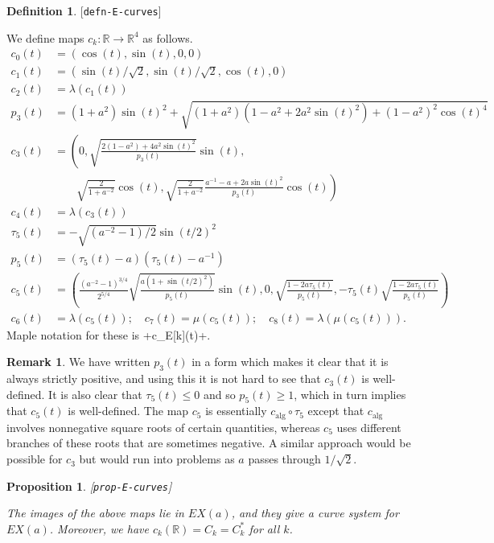 \documentclass[reqno]{amsart}
\newcommand{\lbl}[1]{\label{#1}\textup{[\texttt{#1}]}\par}
\newcommand{\lbl}{\label}
\newcommand{\alg}	{\operatorname{alg}}
\newcommand{\lm}        {\lambda}
\newcommand{\R}         {{\mathbb{R}}}
\newcommand{\rt}        {\sqrt{2}}
\renewcommand{\:}{\colon}
\newtheorem{proposition}[theorem]{Proposition}
\theoremstyle{definition}
\newtheorem{remark}[theorem]{Remark}
\newtheorem{definition}[theorem]{Definition}
\begin{document}
\begin{definition}\lbl{defn-E-curves}
 We define maps $c_k\:\R\to\R^4$ as follows.
 \begin{align*}
  c_0(t) &= (\cos(t),\sin(t),0,0) \\
  c_1(t) &= (\sin(t)/\rt,\sin(t)/\rt,\cos(t),0) \\
  c_2(t) &= \lm(c_1(t)) \\
  p_3(t) &= (1+a^2)\sin(t)^2 +
            \sqrt{(1+a^2)(1-a^2+2a^2\sin(t)^2)+(1-a^2)^2\cos(t)^4} \\
  c_3(t) &= \left(0,
             \sqrt{\frac{2(1-a^2)+4a^2\sin(t)^2}{p_3(t)}}\sin(t),\right.\\
         &\qquad \left.\sqrt{\frac{2}{1+a^{-2}}}\cos(t),
             \sqrt{\frac{2}{1+a^{-2}}}\frac{a^{-1}-a+2a\sin(t)^2}{p_3(t)}\cos(t)\right)\\
  c_4(t) &= \lm(c_3(t)) \\
  \tau_5(t) &= -\sqrt{(a^{-2}-1)/2}\sin(t/2)^2 \\
  p_5(t) &= (\tau_5(t)-a)(\tau_5(t)-a^{-1}) \\
  c_5(t) &= \left(
         \frac{(a^{-2}-1)^{3/4}}{2^{5/4}}\sqrt{\frac{a(1+\sin(t/2)^2)}{p_5(t)}}\sin(t),
         0, \sqrt{\frac{1-2a\tau_5(t)}{p_5(t)}},
         -\tau_5(t)\sqrt{\frac{1-2a\tau_5(t)}{p_5(t)}}
           \right) \\
  c_6(t) &= \lm(c_5(t)); \quad
  c_7(t)  = \mu(c_5(t)); \quad
  c_8(t)  = \lm(\mu(c_5(t))).
 \end{align*}
 Maple notation for these is \mcode+c_E[k](t)+.
\end{definition}
\begin{remark}
 We have written $p_3(t)$ in a form which makes it clear that it is
 always strictly positive, and using this it is not hard to see
 that $c_3(t)$ is well-defined.  It is also clear that
 $\tau_5(t)\leq 0$ and so $p_5(t)\geq 1$, which in turn implies that
 $c_5(t)$ is well-defined.  The map $c_5$ is essentially
 $c_{\alg}\circ\tau_5$ except that $c_{\alg}$ involves nonnegative
 square roots of certain quantities, whereas $c_5$ uses different
 branches of these roots that are sometimes negative.  A similar
 approach would be possible for $c_3$ but would run into problems as
 $a$ passes through $1/\rt$.
\end{remark}

\begin{proposition}\lbl{prop-E-curves}
 The images of the above maps lie in $EX(a)$, and they give a curve
 system for $EX(a)$.  Moreover, we have $c_k(\R)=C_k=C_k^*$ for all
 $k$.
\end{proposition}
\end{document}
